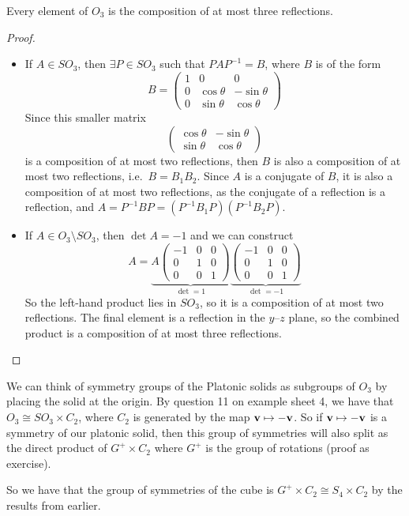 \begin{corollary}
	Every element of \(O_3\) is the composition of at most three reflections.
\end{corollary}
\begin{proof}
	\begin{itemize}
		\item If \(A \in SO_3\), then \(\exists P \in SO_3\) such that \(PAP^{-1} = B\), where \(B\) is of the form
		      \[
			      B = \begin{pmatrix}
				      1 & 0           & 0            \\
				      0 & \cos \theta & -\sin \theta \\
				      0 & \sin \theta & \cos \theta
			      \end{pmatrix}
		      \]
		      Since this smaller matrix
		      \[
			      \begin{pmatrix}
				      \cos \theta & -\sin \theta \\
				      \sin \theta & \cos \theta
			      \end{pmatrix}
		      \]
		      is a composition of at most two reflections, then \(B\) is also a composition of at most two reflections, i.e.\ \(B = B_1 B_2\).
		      Since \(A\) is a conjugate of \(B\), it is also a composition of at most two reflections, as the conjugate of a reflection is a reflection, and \(A = P^{-1}BP = (P^{-1}B_1P)(P^{-1}B_2P)\).
		\item If \(A \in O_3 \setminus SO_3\), then \(\det A = -1\) and we can construct
		      \[
			      A = \underbrace{A\begin{pmatrix}
					      -1 & 0 & 0 \\
					      0  & 1 & 0 \\
					      0  & 0 & 1
				      \end{pmatrix}}_{\det = 1}\underbrace{\begin{pmatrix}
					      -1 & 0 & 0 \\
					      0  & 1 & 0 \\
					      0  & 0 & 1
				      \end{pmatrix}}_{\det = -1}
		      \]
		      So the left-hand product lies in \(SO_3\), so it is a composition of at most two reflections.
		      The final element is a reflection in the \(y\)--\(z\) plane, so the combined product is a composition of at most three reflections.
	\end{itemize}
\end{proof}

\begin{example}
	We can think of symmetry groups of the Platonic solids as subgroups of \(O_3\) by placing the solid at the origin.
	By question 11 on example sheet 4, we have that \(O_3 \cong SO_3 \times C_2\), where \(C_2\) is generated by the map \(\vb v \mapsto -\vb v\).
	So if \(\vb v\mapsto -\vb v\) is a symmetry of our platonic solid, then this group of symmetries will also split as the direct product of \(G^+ \times C_2\) where \(G^+\) is the group of rotations (proof as exercise).

	So we have that the group of symmetries of the cube is \(G^+ \times C_2 \cong S_4 \times C_2\) by the results from earlier.
\end{example}
